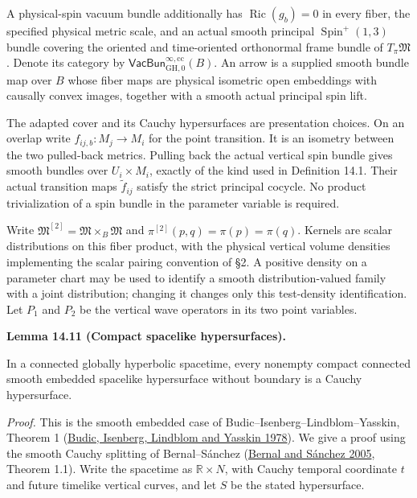 \documentclass[
  english,
  11pt,
  reqno]{amsart}
\makeatletter
\newcounter{none} %
\newcommand{\pandocstatementheading}[1]{%
  \par\addpenalty{\@beginparpenalty}%
  \addvspace{.5\baselineskip plus .2\baselineskip minus .2\baselineskip}%
  {\normalfont\bfseries #1\par}%
  \nobreak\@afterindenttrue\@afterheading
}
\makeatother
\begin{document}
A physical-spin vacuum bundle additionally has
\(\operatorname{Ric}(g_b)=0\) in every fiber, the specified physical
metric scale, and an actual smooth principal
\(\operatorname{Spin}^+(1,3)\) bundle covering the oriented and
time-oriented orthonormal frame bundle of \(T_\pi\mathfrak M\). Denote
its category by
\(\mathsf{VacBun}^{\infty,\mathrm{cc}}_{\mathrm{GH},0}(B)\). An arrow is
a supplied smooth bundle map over \(B\) whose fiber maps are physical
isometric open embeddings with causally convex images, together with a
smooth actual principal spin lift.

The adapted cover and its Cauchy hypersurfaces are presentation choices.
On an overlap write \(f_{ij,b}:M_j\to M_i\) for the point transition. It
is an isometry between the two pulled-back metrics. Pulling back the
actual vertical spin bundle gives smooth bundles over \(U_i\times M_i\),
exactly of the kind used in Definition 14.1. Their actual transition
maps \(\widetilde f_{ij}\) satisfy the strict principal cocycle. No
product trivialization of a spin bundle in the parameter variable is
required.

Write \(\mathfrak M^{[2]}=\mathfrak M\times_B\mathfrak M\) and
\(\pi^{[2]}(p,q)=\pi(p)=\pi(q)\). Kernels are scalar distributions on
this fiber product, with the physical vertical volume densities
implementing the scalar pairing convention of §2. A positive density on
a parameter chart may be used to identify a smooth distribution-valued
family with a joint distribution; changing it changes only this
test-density identification. Let \(P_1\) and \(P_2\) be the vertical
wave operators in its two point variables.

\pandocstatementheading{\protect{}\label{lem:compact-spacelike-is-cauchy}Lemma 14.11 (Compact spacelike hypersurfaces).}

In a connected globally hyperbolic spacetime, every nonempty compact
connected smooth embedded spacelike hypersurface without boundary is a
Cauchy hypersurface.

\emph{Proof.} This is the smooth embedded case of
Budic--Isenberg--Lindblom--Yasskin, Theorem 1
(\hyperref[ref-BudicIsenbergLindblomYasskin1978]{Budic, Isenberg,
Lindblom and Yasskin 1978}). We give a proof using the smooth Cauchy
splitting of Bernal--Sánchez (\hyperref[ref-BernalSanchez2005]{Bernal
and Sánchez 2005}, Theorem 1.1). Write the spacetime as
\(\mathbb R\times N\), with Cauchy temporal coordinate \(t\) and future
timelike vertical curves, and let \(S\) be the stated hypersurface.
\end{document}
